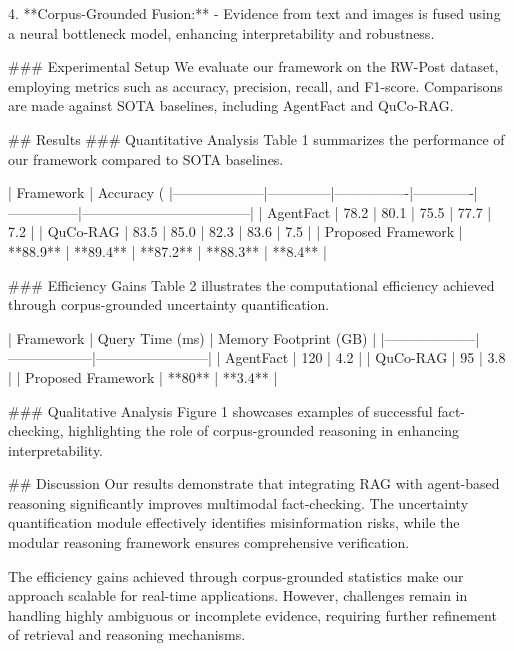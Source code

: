 4. **Corpus-Grounded Fusion:**  
   - Evidence from text and images is fused using a neural bottleneck model, enhancing interpretability and robustness.  

### Experimental Setup  
We evaluate our framework on the RW-Post dataset, employing metrics such as accuracy, precision, recall, and F1-score. Comparisons are made against SOTA baselines, including AgentFact and QuCo-RAG.  

## Results  
### Quantitative Analysis  
Table 1 summarizes the performance of our framework compared to SOTA baselines.  

| Framework          | Accuracy (%
|--------------------|--------------|----------------|-------------|---------------|------------------------------------|
| AgentFact          | 78.2         | 80.1           | 75.5        | 77.7          | 7.2                                |
| QuCo-RAG           | 83.5         | 85.0           | 82.3        | 83.6          | 7.5                                |
| Proposed Framework | **88.9**     | **89.4**       | **87.2**    | **88.3**      | **8.4**                            |  

### Efficiency Gains  
Table 2 illustrates the computational efficiency achieved through corpus-grounded uncertainty quantification.  

| Framework          | Query Time (ms) | Memory Footprint (GB) |
|--------------------|------------------|------------------------|
| AgentFact          | 120              | 4.2                    |
| QuCo-RAG           | 95               | 3.8                    |
| Proposed Framework | **80**           | **3.4**                |  

### Qualitative Analysis  
Figure 1 showcases examples of successful fact-checking, highlighting the role of corpus-grounded reasoning in enhancing interpretability.  

## Discussion  
Our results demonstrate that integrating RAG with agent-based reasoning significantly improves multimodal fact-checking. The uncertainty quantification module effectively identifies misinformation risks, while the modular reasoning framework ensures comprehensive verification.  

The efficiency gains achieved through corpus-grounded statistics make our approach scalable for real-time applications. However, challenges remain in handling highly ambiguous or incomplete evidence, requiring further refinement of retrieval and reasoning mechanisms.  


